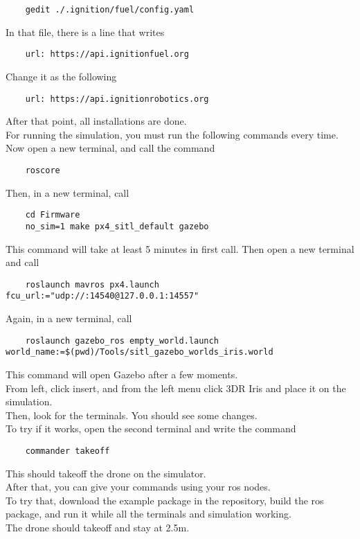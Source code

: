 \documentclass{article}
\begin{document}
\begin{verbatim}
    gedit ./.ignition/fuel/config.yaml
\end{verbatim}
\noindent
In that file, there is a line that writes \\
\begin{verbatim}
    url: https://api.ignitionfuel.org
\end{verbatim}
\noindent
Change it as the following \\
\begin{verbatim}
    url: https://api.ignitionrobotics.org
\end{verbatim}
\noindent
After that point, all installations are done. \\

For running the simulation, you must run the following commands every time. \\

Now open a new terminal, and call the command \\
\begin{verbatim}
    roscore
\end{verbatim}
\noindent
Then, in a new terminal, call \\
\begin{verbatim}
    cd Firmware
    no_sim=1 make px4_sitl_default gazebo
\end{verbatim}
\noindent
This command will take at least 5 minutes in first call.
Then open a new terminal and call \\
\begin{verbatim}
    roslaunch mavros px4.launch fcu_url:="udp://:14540@127.0.0.1:14557"
\end{verbatim}
\noindent
Again, in a new terminal, call \\
\begin{verbatim}
    roslaunch gazebo_ros empty_world.launch world_name:=$(pwd)/Tools/sitl_gazebo_worlds_iris.world
\end{verbatim}
\noindent
This command will open Gazebo after a few moments. \\
From left, click insert, and from the left menu click 3DR Iris and place it on the simulation. \\
Then, look for the terminals. You should see some changes. \\
To try if it works, open the second terminal and write the command \\
\begin{verbatim}
    commander takeoff
\end{verbatim}
\noindent
This should takeoff the drone on the simulator. \\
After that, you can give your commands using your ros nodes. \\
To try that, download the example package in the repository, build the ros package, and run it while all the terminals and simulation working. \\
The drone should takeoff and stay at 2.5m. \\
\end{document}
